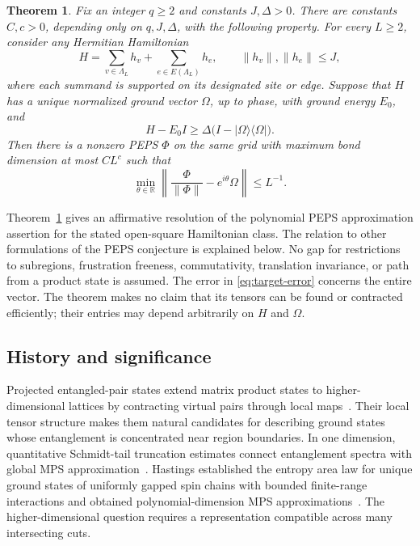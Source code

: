 \documentclass[11pt]{article}
\numberwithin{equation}{section}
\newtheorem{theorem}{Theorem}[section]
\theoremstyle{definition}
\theoremstyle{remark}
\newcommand{\norm}[1]{\lVert #1\rVert}
\begin{document}
\begin{theorem}\label{thm:main}
Fix an integer $q\ge2$ and constants $J,\Delta>0$. There are constants
$C,c>0$, depending only on $q,J,\Delta$, with the following property.
For every $L\ge2$, consider any Hermitian Hamiltonian
\begin{equation}\label{eq:model}
 H=\sum_{v\in\Lambda_L}h_v+\sum_{e\in E(\Lambda_L)}h_e,
 \qquad \norm{h_v},\norm{h_e}\le J,
\end{equation}
where each summand is supported on its designated site or edge.
Suppose that $H$ has a unique normalized ground vector $\Omega$, up to
phase, with ground energy $E_0$, and
\begin{equation}\label{eq:global-gap}
 H-E_0I\ge\Delta\bigl(I-|\Omega\rangle\langle\Omega|\bigr).
\end{equation}
Then there is a nonzero PEPS $\Phi$ on the same grid with maximum bond
dimension at most $CL^c$ such that
\begin{equation}\label{eq:target-error}
 \min_{\theta\in\mathbb R}
 \left\|\frac{\Phi}{\norm{\Phi}}-e^{i\theta}\Omega\right\|
 \le L^{-1}.
\end{equation}
\end{theorem}

Theorem~\ref{thm:main} gives an affirmative resolution of the polynomial
PEPS approximation assertion for the stated open-square Hamiltonian class.
The relation to other formulations of the PEPS conjecture is explained below. No gap for restrictions to subregions,
frustration freeness, commutativity, translation invariance, or path from a
product state is assumed. The error in \eqref{eq:target-error} concerns the
entire vector. The theorem makes no claim that its tensors can be found or
contracted efficiently; their entries may depend arbitrarily on $H$ and
$\Omega$.

\subsection{History and significance}
Projected entangled-pair states extend matrix product states to
higher-dimensional lattices by contracting virtual pairs through local
maps~\cite{VerstraeteCirac2004PEPS}. Their local tensor structure makes them
natural candidates for describing ground states whose entanglement is
concentrated near region boundaries. In one dimension, quantitative
Schmidt-tail truncation estimates connect entanglement spectra with global
MPS approximation~\cite{VerstraeteCirac2006MPS}. Hastings established the
entropy area law for unique ground states of uniformly gapped spin chains
with bounded finite-range interactions and obtained polynomial-dimension
MPS approximations~\cite{Hastings2007}. The higher-dimensional question
requires a representation compatible across many intersecting cuts.
\end{document}
